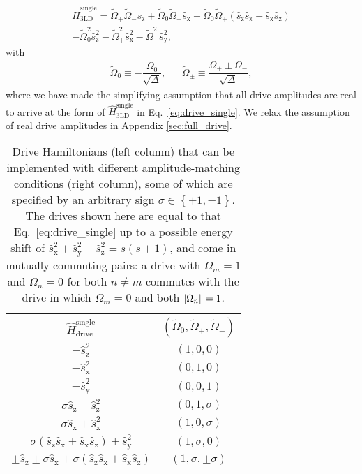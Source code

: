 \documentclass[aps,pra,nofootinbib,twocolumn,superscriptaddress]{revtex4-2}
\renewcommand{\t}{\text} %
\newcommand{\f}[2]{\dfrac{#1}{#2}} %
\newcommand{\p}[1]{\left(#1\right)} %
\renewcommand{\set}[1]{\left\{#1\right\}} %
\newcommand{\1}{\mathds{1}}
\newcommand{\s}{\hat s}
\renewcommand{\H}{\hat H}
\newcommand{\x}{\text{x}}
\newcommand{\y}{\text{y}}
\newcommand{\z}{\text{z}}
\begin{document}
\begin{multline}
  \H_{\t{3LD}}^{\t{single}}
  = \tilde\Omega_+ \tilde\Omega_- \s_\z
  + \tilde\Omega_0 \tilde\Omega_- \s_\x
  + \tilde\Omega_0 \tilde\Omega_+ \p{\s_\z \s_\x  + \s_\x \s_\z} \\
  - \tilde\Omega_0^2 \s_\z^2 - \tilde\Omega_+^2 \s_\x^2
  - \tilde\Omega_-^2 \s_\y^2,
  \label{eq:drive_single}
\end{multline}
with
\begin{align}
  \tilde\Omega_0 \equiv -\f{\Omega_0}{\sqrt\Delta},
  &&
  \tilde\Omega_\pm \equiv \f{\Omega_+\pm\Omega_-}{\sqrt\Delta},
\end{align}
where we have made the simplifying assumption that all drive amplitudes are real to arrive at the form of $\H_{\t{3LD}}^{\t{single}}$ in Eq.~\eqref{eq:drive_single}.
We relax the assumption of real drive amplitudes in Appendix \ref{sec:full_drive}.

\begin{table}
\centering
\caption{
Drive Hamiltonians (left column) that can be implemented with different amplitude-matching conditions (right column), some of which are specified by an arbitrary sign $\sigma\in\set{+1,-1}$.
The drives shown here are equal to that Eq.~\eqref{eq:drive_single} up to a possible energy shift of $\s_\x^2+\s_\y^2+\s_\z^2=s(s+1)$, and come in mutually commuting pairs: a drive with $\Omega_m=1$ and $\Omega_n=0$ for both $n\ne m$ commutes with the drive in which $\Omega_m=0$ and both $\abs*{\Omega_n}=1$.
}
\vspace{.5em}
\begin{tabular}{c|c}
  $\H_{\t{drive}}^{\t{single}}$
  & $(\tilde\Omega_0,\tilde\Omega_+,\tilde\Omega_-)$
  \\ \hline\hline
  $-\s_\z^2$ & $\p{1,0,0}$
  \\ \hline
   $-\s_\x^2$ & $\p{0,1,0}$
  \\ \hline
  $-\s_\y^2$ & $\p{0,0,1}$
  \\ \hline
  $\sigma \s_\z + \s_\z^2$ & $\p{0,1,\sigma}$
  \\ \hline
  $\sigma \s_\x + \s_\x^2$ & $\p{1,0,\sigma}$
  \\ \hline
  $\sigma\p{\s_\z \s_\x+\s_\x \s_\z} + \s_\y^2$ & $\p{1,\sigma,0}$
  \\ \hline
  $\pm \s_\z \pm \sigma \s_\x + \sigma \p{\s_\z \s_\x + \s_\x \s_\z}$
  & $\p{1,\sigma,\pm\sigma}$
\end{tabular}
\label{tab:drives}
\end{table}
\end{document}
